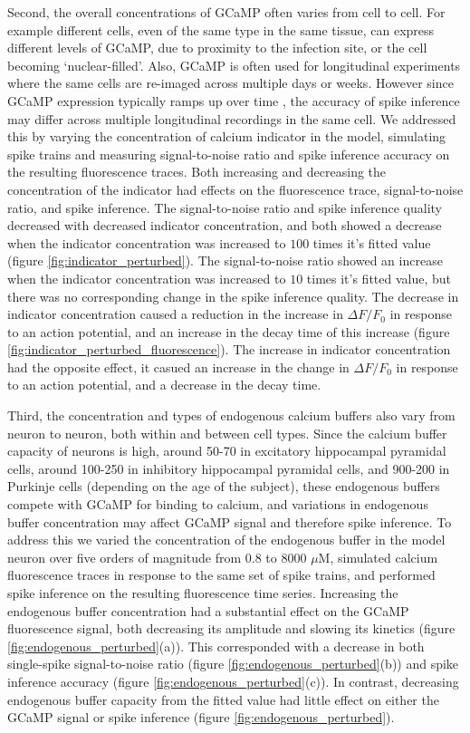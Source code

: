 \documentclass[a4paper,12pt]{article}
\theoremstyle{definition}
\begin{document}
Second, the overall concentrations of GCaMP often varies from cell to cell. For example different cells, even of the same type in the same tissue, can express different levels of GCaMP, due to proximity to the infection site, or the cell becoming `nuclear-filled'\cite{tian, chen}. Also, GCaMP is often used for longitudinal experiments where the same cells are re-imaged across multiple days or weeks. However since GCaMP expression typically ramps up over time \cite{chen}, the accuracy of spike inference may differ across multiple longitudinal recordings in the same cell. We addressed this by varying the concentration of calcium indicator in the model, simulating spike trains and measuring signal-to-noise ratio and spike inference accuracy on the resulting fluorescence traces. Both increasing and decreasing the concentration of the indicator had effects on the fluorescence trace, signal-to-noise ratio, and spike inference. The signal-to-noise ratio and spike inference quality decreased with decreased indicator concentration, and both showed a decrease when the indicator concentration was increased to $100$ times it's fitted value (figure \ref{fig:indicator_perturbed}). The signal-to-noise ratio showed an increase when the indicator concentration was increased to $10$ times it's fitted value, but there was no corresponding change in the spike inference quality. The decrease in indicator concentration caused a reduction in the increase in $\Delta F/F_0$ in response to an action potential, and an increase in the decay time of this increase (figure \ref{fig:indicator_perturbed_fluorescence}). The increase in indicator concentration had the opposite effect, it casued an increase in the change in $\Delta F/F_0$ in response to an action potential, and a decrease in the decay time.

Third, the concentration and types of endogenous calcium buffers also vary from neuron to neuron, both within and between cell types\cite{bartol, maravall, neher}. Since the calcium buffer capacity of neurons is high, around 50-70\cite{lee} in excitatory hippocampal pyramidal cells, around 100-250\cite{lee} in inhibitory hippocampal pyramidal cells, and 900-200 in Purkinje cells (depending on the age of the subject), these endogenous buffers compete with GCaMP for binding to calcium, and variations in endogenous buffer concentration may affect GCaMP signal and therefore spike inference. To address this we varied the concentration of the endogenous buffer in the model neuron over five orders of magnitude from $0.8$ to $8000$ $\mu$M, simulated calcium fluorescence traces in response to the same set of spike trains, and performed spike inference on the resulting fluorescence time series. Increasing the endogenous buffer concentration had a substantial effect on the GCaMP fluorescence signal, both decreasing its amplitude and slowing its kinetics (figure \ref{fig:endogenous_perturbed}(a)). This corresponded with a decrease in both single-spike signal-to-noise ratio (figure \ref{fig:endogenous_perturbed}(b)) and spike inference accuracy (figure \ref{fig:endogenous_perturbed}(c)). In contrast, decreasing endogenous buffer capacity from the fitted value had little effect on either the GCaMP signal or spike inference (figure \ref{fig:endogenous_perturbed}).
\end{document}
